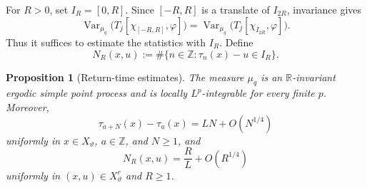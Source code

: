 \documentclass[11pt,reqno,a4paper]{amsart}
\numberwithin{equation}{section}
\theoremstyle{compact}
\newtheorem{proposition}[proposition]{Proposition}
\theoremstyle{definition}
\theoremstyle{definition}
\newcommand{\Var}{\operatorname{Var}}
\begin{document}
For $R>0$, set $I_R=[0,R]$.  Since $[-R,R]$ is a translate of
$I_{2R}$, invariance gives
\begin{equation}\label{eq:weak-mixing-interval-ball-bridge}
  \Var_{\mu_q}\bigl(T_j[\chi_{[-R,R]},\varphi]\bigr)
  =\Var_{\mu_q}\bigl(T_j[\chi_{I_{2R}},\varphi]\bigr).
\end{equation}
Thus it suffices to estimate the statistics with $I_R$.  Define
\begin{equation}\label{eq:wm-return-index-count}
  N_R(x,u)
  :=\#\{n\in\mathbb Z:\tau_n(x)-u\in I_R\}.
\end{equation}

\begin{proposition}[Return-time estimates]
\label{prop:wm-return-time-estimates}
The measure $\mu_q$ is an $\mathbb R$-invariant ergodic simple point process
and is locally $L^p$-integrable for every finite $p$.  Moreover,
\begin{equation}\label{eq:wm-return-time-discrepancy}
  \tau_{a+N}(x)-\tau_a(x)=LN+O(N^{1/4})
\end{equation}
uniformly in $x\in X_\vartheta$, $a\in\mathbb Z$, and $N\geq1$, and
\begin{equation}\label{eq:wm-return-index-count-asymptotic}
  N_R(x,u)=\frac RL+O(R^{1/4})
\end{equation}
uniformly in $(x,u)\in X_\vartheta^r$ and $R\geq1$.
\end{proposition}
\end{document}
